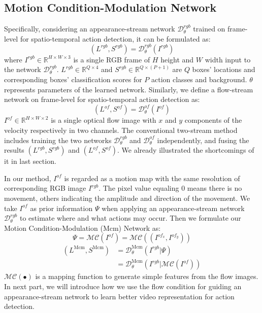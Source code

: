 \documentclass[10pt,twocolumn,letterpaper]{article}
\begin{document}
\subsection{Motion Condition-Modulation Network}
Specifically, considering an appearance-stream network $\mathcal{D}^{rgb}_{\theta}$ trained on frame-level for spatio-temporal action detection, it can be formulated as:
\begin{equation}
(L^{rgb}, S^{rgb}) = \mathcal{D}^{rgb}_{\theta}(I^{rgb})
\end{equation}
where $I^{rgb}\in\mathbb{R}^{H \times W \times 3}$ is a single RGB frame of $H$ height and $W$ width input to the network $\mathcal{D}^{rgb}_{\theta}$. $L^{rgb}\in\mathbb{R}^{Q \times 4}$ and $S^{rgb}\in\mathbb{R}^{Q \times (P+1)}$ are $Q$ boxes' locations and corresponding boxes' classification scores for $P$ action classes and background. $\theta$ represents parameters of the learned network. Similarly, we define a flow-stream network on frame-level for spatio-temporal action detection as:
\begin{equation}
(L^{of}, S^{of}) = \mathcal{D}^{of}_{\theta}(I^{of})
\end{equation}
$I^{of}\in\mathbb{R}^{H \times W \times 2}$ is a single optical flow image with $x$ and $y$ components of the velocity respectively in two channels. The conventional two-stream method includes training the two networks $\mathcal{D}^{rgb}_{\theta}$ and $\mathcal{D}^{of}_{\theta}$ independently, and fusing the results $(L^{rgb}, S^{rgb})$ and  $(L^{of}, S^{of})$. We already illustrated the shortcomings of it in last section. 

In our method, $I^{of}$ is regarded as a motion map with the same resolution of corresponding RGB image $I^{rgb}$. The pixel value equaling 0 means there is no movement, others indicating the amplitude and direction of the movement. We take $I^{of}$ as prior information $\Psi$ when applying an appearance-stream network $\mathcal{D}^{rgb}_{\theta}$ to estimate where and what actions may occur. Then we formulate our Motion Condition-Modulation (Mcm) Network as:
\begin{equation}
\Psi = \mathcal{MC}(I^{of}) = \mathcal{MC}((I^{of_x},I^{of_y}))
\end{equation}
\begin{equation}
\begin{aligned}
(L^{\mathrm{Mcm}}, S^{\mathrm{Mcm}}) &= \mathcal{D}^{\mathrm{Mcm}}_{\theta}(I^{rgb}|\Psi)\\
&=\mathcal{D}^{\mathrm{Mcm}}_{\theta}(I^{rgb}|\mathcal{MC}(I^{of}))
\end{aligned}
\end{equation}
$\mathcal{MC}(\bullet)$ is a mapping function to generate simple features from the flow images. In next part, we will introduce how we use the flow condition for guiding an appearance-stream network to learn better video representation for action detection.
\end{document}
